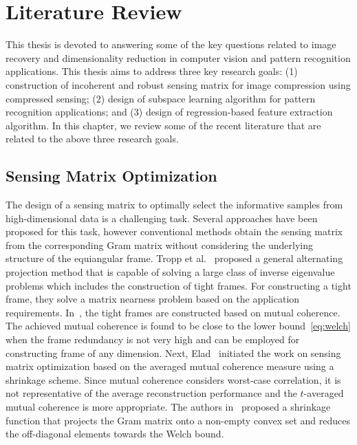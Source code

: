\chapter{Literature Review}
\label{chap: Literature}
This thesis is devoted to answering some of the key questions related to image recovery and dimensionality reduction in computer vision and pattern recognition applications. This thesis aims to address three key research goals: (1) construction of incoherent and robust sensing matrix for image compression using compressed sensing; (2) design of subspace learning algorithm for pattern recognition applications; and (3) design of regression-based feature extraction algorithm. In this chapter, we review some of the recent literature that are related to the above three research goals. 
%
\section{Sensing Matrix Optimization}
\label{sec: Chap2_Sensing_matrix}
%
The design of a sensing matrix to optimally select the informative samples from high-dimensional data is a challenging task. Several approaches have been proposed for this task, however conventional methods obtain the sensing matrix from the corresponding Gram matrix without considering the underlying structure of the equiangular frame. Tropp et al.~\cite{Frame} proposed a general alternating projection method that is capable of solving a large class of inverse eigenvalue problems which includes the construction of tight frames. For constructing a tight frame, they solve a matrix nearness problem based on the application requirements. In~\cite{Eva_frame}, the tight frames are constructed based on mutual coherence. The achieved mutual coherence is found to be close to the lower bound~\eqref{eq:welch} when the frame redundancy is not very high and can be employed for constructing frame of any dimension.
Next, Elad~\cite{Elad} initiated the work on sensing matrix optimization based on the averaged mutual coherence measure using a shrinkage scheme. Since mutual coherence considers worst-case correlation, it is not representative of the average reconstruction performance and the $t$-averaged mutual coherence is more appropriate. The authors in~\cite{Xuprojection} proposed a shrinkage function that projects the Gram matrix onto a non-empty convex set and reduces the off-diagonal elements towards the Welch bound. 

